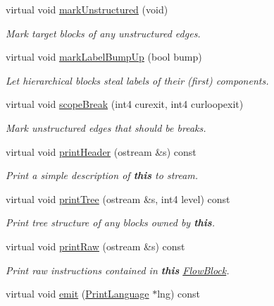 \begin{DoxyCompactItemize}
virtual void \mbox{\hyperlink{class_flow_block_ad06e84d3405ffe52bc29837265402d78}{mark\+Unstructured}} (void)
\begin{DoxyCompactList}\small\item\em Mark target blocks of any unstructured edges. \end{DoxyCompactList}\item 
virtual void \mbox{\hyperlink{class_flow_block_a0882ce85a017e4988eda779de6a86089}{mark\+Label\+Bump\+Up}} (bool bump)
\begin{DoxyCompactList}\small\item\em Let hierarchical blocks steal labels of their (first) components. \end{DoxyCompactList}\item 
virtual void \mbox{\hyperlink{class_flow_block_a392611cfd24306f58ea6e18371809223}{scope\+Break}} (int4 curexit, int4 curloopexit)
\begin{DoxyCompactList}\small\item\em Mark unstructured edges that should be {\itshape breaks}. \end{DoxyCompactList}\item 
virtual void \mbox{\hyperlink{class_flow_block_a0d19c5b80186cf289dfbe0ce9e3ce37a}{print\+Header}} (ostream \&s) const
\begin{DoxyCompactList}\small\item\em Print a simple description of {\bfseries{this}} to stream. \end{DoxyCompactList}\item 
virtual void \mbox{\hyperlink{class_flow_block_ae00f14fc1916599ec34074fbb010c74b}{print\+Tree}} (ostream \&s, int4 level) const
\begin{DoxyCompactList}\small\item\em Print tree structure of any blocks owned by {\bfseries{this}}. \end{DoxyCompactList}\item 
virtual void \mbox{\hyperlink{class_flow_block_aa5bd09d25026872141e42118b03119b1}{print\+Raw}} (ostream \&s) const
\begin{DoxyCompactList}\small\item\em Print raw instructions contained in {\bfseries{this}} \mbox{\hyperlink{class_flow_block}{Flow\+Block}}. \end{DoxyCompactList}\item 
virtual void \mbox{\hyperlink{class_flow_block_a9baddec2635c95a5ac9019d6b21d3eab}{emit}} (\mbox{\hyperlink{class_print_language}{Print\+Language}} $\ast$lng) const

\end{DoxyCompactItemize}
